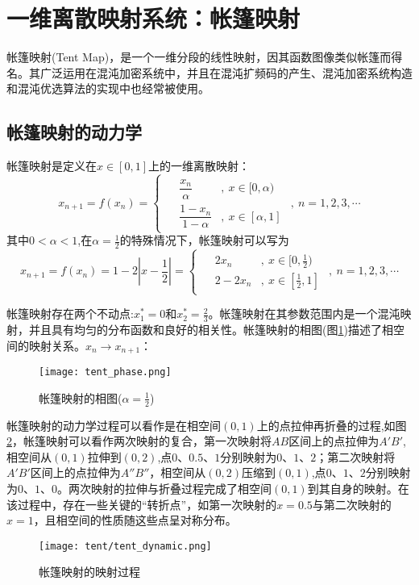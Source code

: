 \section{一维离散映射系统：帐篷映射}
帐篷映射(Tent Map)，是一个一维分段的线性映射，因其函数图像类似帐篷而得名。其广泛运用在混沌加密系统中，并且在混沌扩频码的产生、混沌加密系统构造和混沌优选算法的实现中也经常被使用。

\subsection{帐篷映射的动力学}

帐篷映射是定义在$x\in [0,1]$上的一维离散映射：
\begin{equation}
    x_{n+1}=f(x_n)=
    \begin{cases}
        \begin{aligned}
            &\dfrac{x_n}{\alpha}&,\ x\in [0,\alpha)\\
            &\dfrac{1-x_n}{1-\alpha}&,\ x\in [\alpha,1]
        \end{aligned}
    \end{cases},\ n=1,2,3,\cdots
\end{equation}
其中$0<\alpha<1$,在$\alpha=\frac{1}{2}$的特殊情况下，帐篷映射可以写为
\begin{equation}
    x_{n+1}=f(x_n)=1-2|x-\frac{1}{2}|=
    \begin{cases}
        \begin{aligned}
            &2x_n&,\ x\in [0,\frac{1}{2})\\
            &2-2x_n&,\ x\in [\frac{1}{2},1]
        \end{aligned}
    \end{cases},\ n=1,2,3,\cdots
\end{equation}

帐篷映射存在两个不动点:$x_1^*=0$和$x_2^*=\frac{2}{3}$。帐篷映射在其参数范围内是一个混沌映射，并且具有均匀的分布函数和良好的相关性。帐篷映射的相图(图\ref{fig:tent_pha})描述了相空间的映射关系。$x_n\rightarrow x_{n+1}$：
\begin{figure}[!]
	\centering
	\texttt{[image: tent\_phase.png]}
    \caption{帐篷映射的相图($\alpha=\frac{1}{2}$)}
    \label{fig:tent_pha}
\end{figure}

帐篷映射的动力学过程可以看作是在相空间$(0,1)$上的点拉伸再折叠的过程,如图\ref{fig:tent_dyna}，帐篷映射可以看作两次映射的复合，第一次映射将$AB$区间上的点拉伸为$A'B'$,相空间从$(0,1)$拉伸到$(0,2)$,点$0$、$0.5$、$1$分别映射为$0$、$1$、$2$；第二次映射将$A'B'$区间上的点拉伸为$A''B''$，相空间从$(0,2)$压缩到$(0,1)$,点$0$、$1$、$2$分别映射为$0$、$1$、$0$。两次映射的拉伸与折叠过程完成了相空间$(0,1)$到其自身的映射。在该过程中，存在一些关键的“转折点”，如第一次映射的$x=0.5$与第二次映射的$x=1$，且相空间的性质随这些点呈对称分布。
\begin{figure}[!]
	\centering
	\texttt{[image: tent/tent\_dynamic.png]}
    \caption{帐篷映射的映射过程}
    \label{fig:tent_dyna}
\end{figure}


